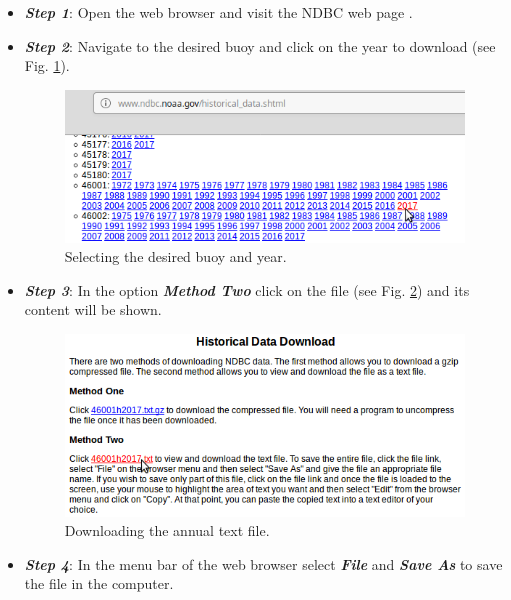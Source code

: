 \begin{onehalfspace}
				\begin{itemize}
					\item \textit{\textbf{Step 1}}: Open the web browser and visit the NDBC web page \cite{NOAA_1}.
					\item \textit{\textbf{Step 2}}: Navigate to the desired buoy and click on the year to download (see Fig. \ref{fig:selectingBuoy}).
						\begin{figure}[ht!]
							\centering
							\includegraphics[scale=0.48]{figures/selectingBuoy.png}
							\caption{Selecting the desired buoy and year.}
							\label{fig:selectingBuoy}
						\end{figure}
					\item \textit{\textbf{Step 3}}: In the option \textit{\textbf{Method Two}} click on the file (see Fig. \ref{fig:downloadingTextFile}) and its content will be shown.
						\begin{figure}[ht!]
							\centering
							\includegraphics[scale=0.48]{figures/downloadingTextFile.png}
							\caption{Downloading the annual text file.}
							\label{fig:downloadingTextFile}
						\end{figure}
					\item \textit{\textbf{Step 4}}: In the menu bar of the web browser select \textit{\textbf{File}} and \textit{\textbf{Save As}} to save the file in the computer.
				\end{itemize}
			

\end{onehalfspace}
